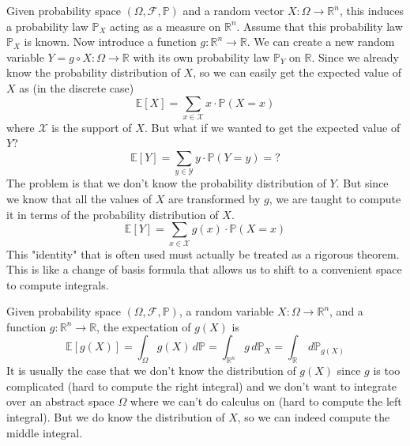     Given probability space $(\Omega, \mathcal{F}, \mathbb{P})$ and a random vector $X: \Omega \rightarrow \mathbb{R}^n$, this induces a probability law $\mathbb{P}_X$ acting as a measure on $\mathbb{R}^n$. Assume that this probability law $\mathbb{P}_X$ is known. Now introduce a function $g: \mathbb{R}^n \rightarrow \mathbb{R}$. We can create a new random variable $Y = g \circ X : \Omega \rightarrow \mathbb{R}$ with its own probability law $\mathbb{P}_Y$ on $\mathbb{R}$. Since we already know the probability distribution of $X$, so we can easily get the expected value of $X$ as (in the discrete case) 
    \begin{equation}
      \mathbb{E}[X] = \sum_{x \in \mathcal{X}} x \cdot \mathbb{P}(X = x)
    \end{equation}
    where $\mathcal{X}$ is the support of $X$. But what if we wanted to get the expected value of $Y$? 
    \begin{equation}
      \mathbb{E}[Y] = \sum_{y \in \mathcal{Y}} y \cdot \mathbb{P}(Y = y) = ?
    \end{equation}
    The problem is that we don't know the probability distribution of $Y$. But since we know that all the values of $X$ are transformed by $g$, we are taught to compute it in terms of the probability distribution of $X$. 
    \begin{equation}
      \mathbb{E}[Y] = \sum_{x \in \mathcal{X}} g(x) \cdot \mathbb{P}(X = x)
    \end{equation}
    This "identity" that is often used must actually be treated as a rigorous theorem. This is like a change of basis formula that allows us to shift to a convenient space to compute integrals. 

    \begin{theorem}[LOTUS]
      Given probability space $(\Omega, \mathcal{F}, \mathbb{P})$, a random variable $X: \Omega \rightarrow \mathbb{R}^n$, and a function $g: \mathbb{R}^n \rightarrow \mathbb{R}$, the expectation of $g(X)$ is 
      \begin{equation}
        \mathbb{E}[g(X)] = \int_\Omega g(X) \,d\mathbb{P} = \int_{\mathbb{R}^n} g \, d\mathbb{P}_X = \int_\mathbb{R} \,d \mathbb{P}_{g(X)}
      \end{equation}
      It is usually the case that we don't know the distribution of $g(X)$ since $g$ is too complicated (hard to compute the right integral) and we don't want to integrate over an abstract space $\Omega$ where we can't do calculus on (hard to compute the left integral). But we do know the distribution of $X$, so we can indeed compute the middle integral. 
    \end{theorem}

